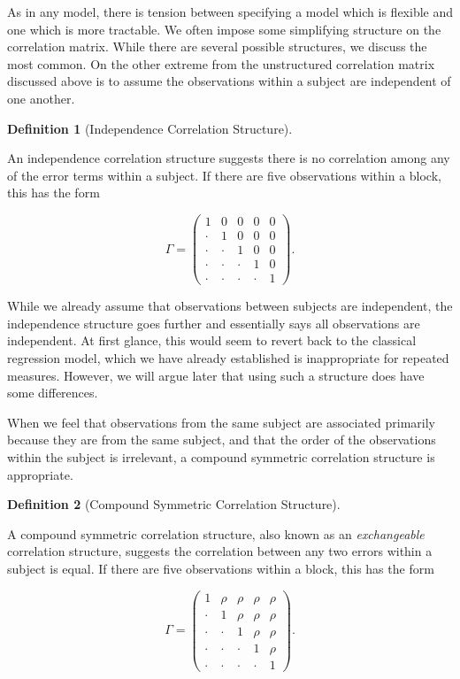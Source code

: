 \documentclass[
  letterpaper,
  DIV=11,
  numbers=noendperiod]{scrreprt}
\theoremstyle{definition}
\newtheorem{definition}{Definition}[chapter]
\theoremstyle{definition}
\theoremstyle{remark}
\begin{document}
As in any model, there is tension between specifying a model which is
flexible and one which is more tractable. We often impose some
simplifying structure on the correlation matrix. While there are several
possible structures, we discuss the most common. On the other extreme
from the unstructured correlation matrix discussed above is to assume
the observations within a subject are independent of one another.

\begin{definition}[Independence Correlation
Structure]\protect\hypertarget{def-independence-correlation-structure}{}\label{def-independence-correlation-structure}

An independence correlation structure suggests there is no correlation
among any of the error terms within a subject. If there are five
observations within a block, this has the form

\[\Gamma = \begin{pmatrix} 
1 & 0 & 0 & 0 & 0 \\
\cdot & 1 & 0 & 0 & 0 \\
\cdot & \cdot & 1 & 0 & 0 \\
\cdot & \cdot & \cdot & 1 & 0 \\
\cdot & \cdot & \cdot & \cdot & 1 \end{pmatrix}.\]

\end{definition}

While we already assume that observations between subjects are
independent, the independence structure goes further and essentially
says all observations are independent. At first glance, this would seem
to revert back to the classical regression model, which we have already
established is inappropriate for repeated measures. However, we will
argue later that using such a structure does have some differences.

When we feel that observations from the same subject are associated
primarily because they are from the same subject, and that the order of
the observations within the subject is irrelevant, a compound symmetric
correlation structure is appropriate.

\begin{definition}[Compound Symmetric Correlation
Structure]\protect\hypertarget{def-compound-symmetric-correlation-structure}{}\label{def-compound-symmetric-correlation-structure}

A compound symmetric correlation structure, also known as an
\emph{exchangeable} correlation structure, suggests the correlation
between any two errors within a subject is equal. If there are five
observations within a block, this has the form

\[\Gamma = \begin{pmatrix} 
1 & \rho & \rho & \rho & \rho \\
\cdot & 1 & \rho & \rho & \rho \\
\cdot & \cdot & 1 & \rho & \rho \\
\cdot & \cdot & \cdot & 1 & \rho \\
\cdot & \cdot & \cdot & \cdot & 1 \end{pmatrix}.\]

\end{definition}
\end{document}

